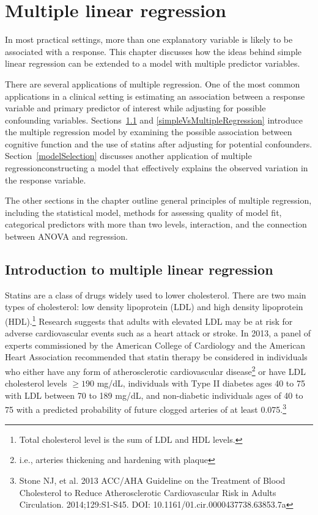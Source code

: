 
\chapter{Multiple linear regression}
\label{multipleLinearRegression}

In most practical settings, more than one explanatory variable is likely to be associated with a response. This chapter discusses how the ideas behind simple linear regression can be extended to a model with multiple predictor variables. 

There are several applications of multiple regression. One of the most common applications in a clinical setting is estimating an association between a response variable and primary predictor of interest while adjusting for possible confounding variables. Sections~\ref{introductionMultipleLinearRegression} and \ref{simpleVsMultipleRegression} introduce the multiple regression model by examining the possible association between cognitive function and the use of statins after adjusting for potential confounders. Section~\ref{modelSelection} discusses another application of multiple regression\textemdash constructing a model that effectively explains the observed variation in the response variable. 

The other sections in the chapter outline general principles of multiple regression, including the statistical model, methods for assessing quality of model fit, categorical predictors with more than two levels, interaction, and the connection between ANOVA and regression.


\section{Introduction to multiple linear regression}
\label{introductionMultipleLinearRegression}

Statins are a class of drugs widely used to lower cholesterol. There are two main types of cholesterol: low density lipoprotein (LDL) and high density lipoprotein (HDL).\footnote{Total cholesterol level is the sum of LDL and HDL levels.} Research suggests that adults with elevated LDL may be at risk for adverse cardiovascular events such as a heart attack or stroke. In 2013, a panel of experts commissioned by the American College of Cardiology and the American Heart Association recommended that statin therapy be considered in individuals who either have any form of atherosclerotic cardiovascular disease\footnote{i.e., arteries thickening and hardening with plaque} or have LDL cholesterol levels $\geq 190$ mg/dL, individuals with Type II diabetes ages 40 to 75 with LDL between 70 to 189 mg/dL, and non-diabetic individuals ages of 40 to 75 with a predicted probability of future clogged arteries of at least 0.075.\footnote{Stone NJ, et al. 2013 ACC/AHA Guideline on the Treatment of Blood Cholesterol to Reduce Atherosclerotic Cardiovascular Risk in Adults Circulation. 2014;129:S1-S45. DOI: 10.1161/01.cir.0000437738.63853.7a}

